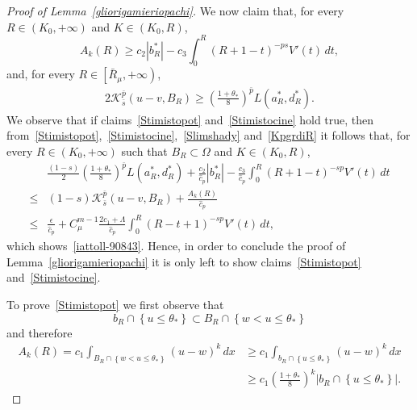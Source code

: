 \documentclass[12pt]{article}
\numberwithin{equation}{section}
\renewcommand{\leq}{\leqslant}
\renewcommand{\geq}{\geqslant}
\begin{document}
\begin{proof}[Proof of Lemma~\ref{gliorigamieriopachi}]
We now claim that, for every $R\in(K_0,+\infty)$ and $K\in (K_0,R)$,
\begin{equation}\label{Stimistopot}
A_k(R) \geq c_2\left|b_R^{*} \right|-c_3\int_{0}^R(R+1-t)^{-ps}V'(t)\,dt,
\end{equation}
and, for every $R\in \left[\bar{R}_\mu,+\infty\right)$,
\begin{equation}\label{Stimistocine}
\begin{split}
2\mathcal{K}_{\bar{s}}^{\bar{p}}\left(u-v,B_R\right) \geq \left(\frac{1+\theta_*}{8}\right)^{\bar{p}}L(a_R^*,d_R^*).
\end{split}
\end{equation}
We observe that if claims~\eqref{Stimistopot} and~\eqref{Stimistocine} hold true, then  from~\eqref{Stimistopot},~\eqref{Stimistocine},~\eqref{Slimshady} and~\eqref{KpgrdiR} it follows that, for every $R\in \left(K_0,+\infty\right)$ such that $B_R\subset\Omega$ and $K\in (K_0,R)$,
\begin{equation*}
\begin{split}
&\frac{(1-s)}{2}\left(\frac{1+\theta_*}{8}\right)^{\bar{p}} L(a_R^*,d_R^*) +\frac{c_2}{\hat{c}_p}\left|b_R^*\right|-\frac{c_3}{\hat{c}_p}\int_{0}^R (R+1-t)^{-sp} V'(t)\,dt\\ 
\leq & (1-s) \mathcal{K}_{\bar{s}}^{\bar{p}}(u-v,B_R) +\frac{A_k(R)}{\hat{c}_p}\\
\leq &\frac{\epsilon}{\hat{c}_p}+C_\mu^{m-1} \frac{2c_1+\Lambda}{\hat{c}_p} \int_{0}^R \left(R-t+1\right)^{-sp}V'(t)\,dt,    
\end{split}
\end{equation*}
which shows~\eqref{iattoll-90843}. Hence, in order to conclude the proof of Lemma~\ref{gliorigamieriopachi} it is only left to show claims~\eqref{Stimistopot} and~\eqref{Stimistocine}. 

To prove~\eqref{Stimistopot} we first observe that
\begin{equation*}
b_R\cap\left\lbrace u\leq \theta_* \right\rbrace \subset B_R\cap \left\lbrace w<u\leq \theta_*\right\rbrace
\end{equation*}
and therefore
\begin{equation}\label{hntecopeeewd}
\begin{split}
A_{k}(R)=c_1\int_{B_R\cap \left\lbrace w<u\leq \theta_*\right\rbrace} (u-w)^k\,dx &\geq c_1\int_{b_R\cap \left\lbrace u\leq \theta_* \right\rbrace}(u-w)^k\,dx\\
&\geq c_1\left(\frac{1+\theta_*}{8}\right)^k\left|b_R\cap \left\lbrace u\leq \theta_*\right\rbrace\right|. 
\end{split}
\end{equation}


\end{proof}
\end{document}
